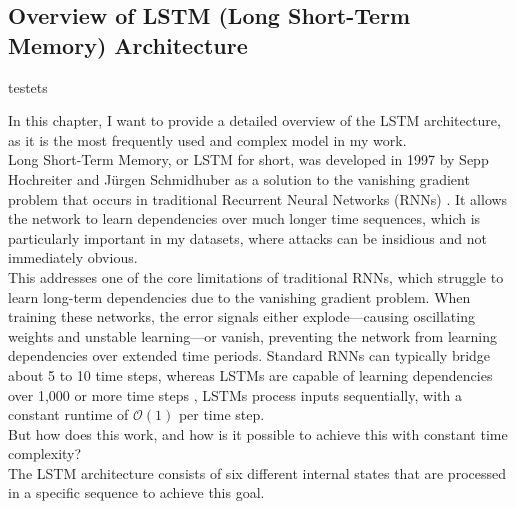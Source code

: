 \subsection{Overview of LSTM (Long Short-Term Memory) Architecture}

testets

In this chapter, I want to provide a detailed overview of the LSTM architecture, as it is the most frequently used and complex model in my work.\\
Long Short-Term Memory, or LSTM for short, was developed in 1997 by Sepp Hochreiter and Jürgen Schmidhuber as a solution to the vanishing gradient problem that occurs in traditional Recurrent Neural Networks (RNNs) \cite{LSTM_understanding}. It allows the network to learn dependencies over much longer time sequences, which is particularly important in my datasets, where attacks can be insidious and not immediately obvious.\\
This addresses one of the core limitations of traditional RNNs, which struggle to learn long-term dependencies due to the vanishing gradient problem. When training these networks, the error signals either explode—causing oscillating weights and unstable learning—or vanish, preventing the network from learning dependencies over extended time periods. Standard RNNs can typically bridge about 5 to 10 time steps, whereas LSTMs are capable of learning dependencies over 1,000 or more time steps \cite{LSTM_understanding}, LSTMs process inputs sequentially, with a constant runtime of $\mathcal{O}(1)$ per time step.\\
But how does this work, and how is it possible to achieve this with constant time complexity?\\
The LSTM architecture consists of six different internal states that are processed in a specific sequence to achieve this goal.

